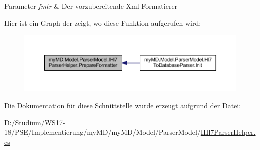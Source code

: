 \begin{DoxyParams}{Parameter}
{\em fmtr} & Der vorzubereitende Xml-\/\+Formatierer\\
\hline
\end{DoxyParams}
Hier ist ein Graph der zeigt, wo diese Funktion aufgerufen wird\+:
\nopagebreak
\begin{figure}[H]
\begin{center}
\leavevmode
\includegraphics[width=350pt]{interfacemy_m_d_1_1_model_1_1_parser_model_1_1_i_hl7_parser_helper_ab4114a84678d1b0ce5df7fdc00119dc4_icgraph}
\end{center}
\end{figure}


Die Dokumentation für diese Schnittstelle wurde erzeugt aufgrund der Datei\+:\begin{DoxyCompactItemize}
\item 
D\+:/\+Studium/\+W\+S17-\/18/\+P\+S\+E/\+Implementierung/my\+M\+D/my\+M\+D/\+Model/\+Parser\+Model/\mbox{\hyperlink{_i_hl7_parser_helper_8cs}{I\+Hl7\+Parser\+Helper.\+cs}}\end{DoxyCompactItemize}
